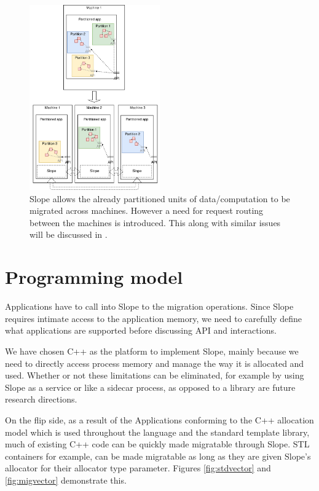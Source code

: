 \begin{figure}[t]
\centering

\includegraphics[width=0.5\textwidth]{design-goals-pluggable.drawio}
\caption{
    Slope allows the already partitioned units of
    data/computation to be migrated across machines. However a need for request
    routing between the machines is introduced. This along with similar issues
    will be discussed in .
}
\label{fig:designgoalspluggable}
\end{figure}

\section{Programming model}
\label{sec:platform}

Applications have to call into Slope to  the
migration operations. Since Slope requires intimate access to the application
memory, we need to carefully define what applications are supported
before discussing API and interactions.

We have chosen C++ as the platform to implement Slope, mainly because we need
to directly access process memory and manage the way it is allocated and used.
Whether or not these limitations can be eliminated, for example by using Slope
as a service or like a sidecar process, as opposed to a library are future
research directions.

On the flip side, as a result of the Applications conforming to the C++
allocation model which is used throughout the language and the standard
template library, much of existing C++ code can be quickly made
migratable through Slope. STL containers for example, can be made migratable
as long as they are given Slope's allocator for their allocator type parameter.
Figures \ref{fig:stdvector} and \ref{fig:migvector} demonstrate this.

